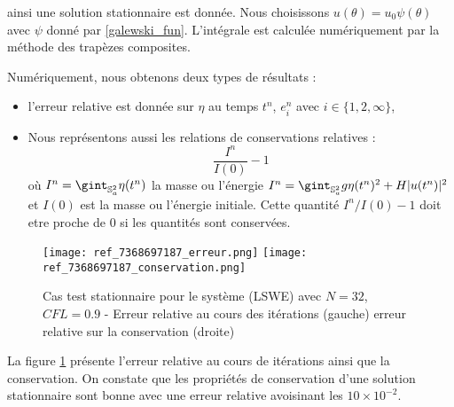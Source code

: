 ainsi une solution stationnaire est donnée. Nous choisissons $u(\theta) = u_0 \psi( \theta )$ avec $\psi$ donné par \eqref{galewski_fun}. L'intégrale est calculée numériquement par la méthode des trapèzes composites.

Numériquement, nous obtenons deux types de résultats :
\begin{itemize}
\item  l'erreur relative est donnée sur $\eta$ au temps $t^n$, $e_i^n$ avec $i \in \lbrace 1, 2, \infty \rbrace$,
\item Nous représentons aussi les relations de conservations relatives :
\begin{equation}
\dfrac{I^n}{I(0)}-1
\end{equation}
où  $I^n = \gint_{\mathbb{S}_a^2} \eta (t^n)$ la masse ou l'énergie $I^n = \gint_{\mathbb{S}_a^2} g \eta (t^n)^2 + H |u(t^n) |^2$ et $I(0)$ est la masse ou l'énergie initiale. Cette quantité $I^n/I(0)-1$ doit etre proche de $0$ si les quantités sont conservées.
\end{itemize} 

\begin{figure}[ht!]
\begin{center}
\texttt{[image: ref\_7368697187\_erreur.png]}
\texttt{[image: ref\_7368697187\_conservation.png]}
\caption{Cas test stationnaire pour le système (LSWE) avec $N=32$, $CFL=0.9$ - Erreur relative au cours des itérations (gauche) erreur relative sur la conservation (droite)}
\label{fig:err and cons lswe2}
\end{center}
\end{figure}

La figure \ref{fig:err and cons lswe2} présente l'erreur relative au cours de itérations ainsi que la conservation. On constate que les propriétés de conservation d'une solution stationnaire sont bonne avec une erreur relative avoisinant les $10 \times 10^{-2}$. 